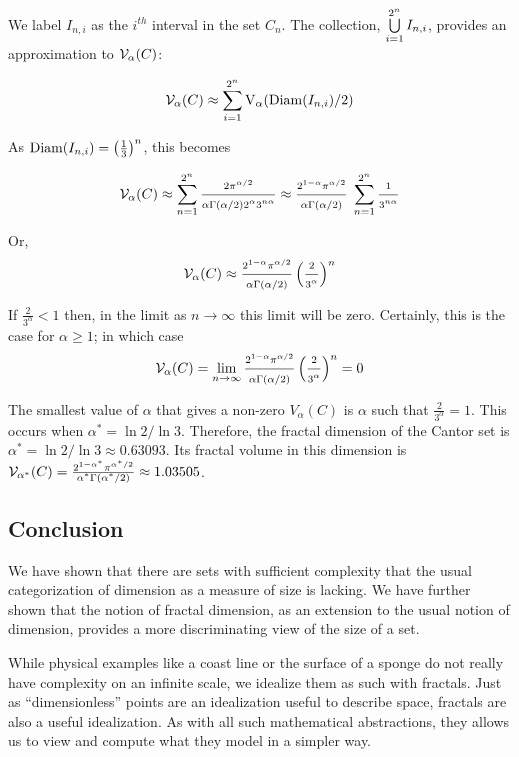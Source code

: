 {We label $I_{n,i}$ as the $i^{th}$ interval in the set
$C_n$. The collection, $\bigcup_{i=1}^{2^n}\limits I_{n,i}$, provides an
approximation to ${\cal V}_\alpha(C)$:


$$
{\cal V}_\alpha(C) \approx \sum_{i=1}^{2^n} {\rm V}_\alpha({\rm
  Diam}(I_{n,i}) / 2)
$$

As ${\rm Diam}(I_{n,i}) = \left(\frac{1}{3}\right)^n$, this becomes


$$
{\cal V}_\alpha(C) \approx \sum_{n=1}^{2^n} \frac{2
  \pi^{\alpha/2}}{ \alpha \Gamma(\alpha/2) 2^\alpha 3^{n\alpha}} 
  \approx  \frac{
  2^{1 - \alpha} \pi^{\alpha/2}}{\alpha \Gamma(\alpha/2)} \;
  \sum_{n=1}^{2^n}  
\frac{1}{3^{n\alpha}}
$$

Or, 
$$
{\cal V}_\alpha(C) \approx \frac{ 2^{1-\alpha} \pi^{\alpha/2}}{\alpha
  \Gamma(\alpha/2)} \left(\frac{2}{3^\alpha}\right)^n
$$


If $\frac{2}{3^\alpha} < 1$ then, in the limit as 
$n \rightarrow \infty$ 
this limit will be zero. Certainly,
this is the case for $\alpha \ge 1$; in which case 
$$
{\cal V}_\alpha(C) =  \lim_{n \rightarrow \infty}  \frac{ 2^{1-\alpha} 
\pi^{\alpha/2}}{\alpha
  \Gamma(\alpha/2)} \left(\frac{2}{3^\alpha}\right)^n = 0 
$$

The smallest value of $\alpha$ that gives a non-zero $V_\alpha(C)$ 
is $\alpha$ such that $\frac{2}{3^\alpha} = 1$. 
This occurs when
$\alpha^* = \ln 2 / \ln 3$. Therefore, the fractal dimension of the
Cantor set is $\alpha^* = \ln 2 / \ln 3 \approx 0.63093$. 
Its fractal volume in this
dimension is ${\cal V}_{\alpha^*}(C) =  \frac{2^{1-\alpha^*} 
\pi^{\alpha^*/2}}{\alpha^*
\Gamma(\alpha^* / 2)} \approx 1.03505 $.

\subsection{Conclusion}
We have shown that there are sets with sufficient complexity that the
usual categorization of dimension as a measure of size is lacking. 
We have further shown
that the notion of fractal dimension, as an extension to the usual
notion of dimension, provides a more discriminating view of the size
of a set.

While physical examples like a coast line or the surface of a sponge do 
not really have
complexity on an infinite scale, we idealize them as such with
fractals. Just as ``dimensionless'' points are an idealization useful
to describe space, fractals are also a useful idealization. 
As with all such mathematical abstractions, they 
allows us to view and compute what they model in a simpler way.

}

